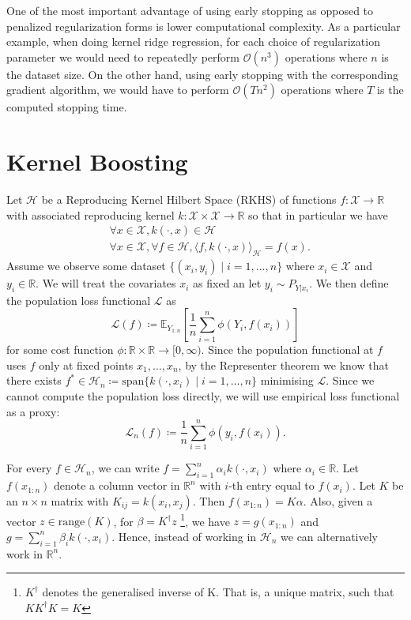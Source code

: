 One of the most important advantage of using early stopping as opposed to penalized
regularization forms is lower computational complexity.
As a particular example, when doing kernel ridge regression, for each choice of
regularization parameter we would need to repeatedly perform $\mathcal{O}(n^{3})$
operations where $n$ is the dataset size. On the other hand, using early stopping
with the corresponding gradient algorithm, we would have to perform $\mathcal{O}(Tn^{2})$
operations where $T$ is the computed stopping time.

\section{Kernel Boosting}

Let $\mathcal{H}$ be a Reproducing Kernel Hilbert Space (RKHS) of functions
$f : \mathcal{X} \to \mathbb{R}$ with associated reproducing kernel
$k : \mathcal{X} \times \mathcal{X} \to \mathbb{R}$ so that in particular we have
\begin{align*}
  &\forall x \in \mathcal{X}, k(\cdot, x) \in \mathcal{H} \\
  &\forall x \in \mathcal{X}, \forall f \in \mathcal{H}, \langle f, k(\cdot, x) \rangle_{\mathcal{H}} = f(x).
\end{align*}
Assume we observe some dataset $\{(x_{i}, y_{i}) \mid i = 1, \dots, n\}$
where $x_{i} \in \mathcal{X}$ and $y_{i} \in \mathbb{R}$.
We will treat the covariates $x_{i}$ as fixed an let $y_{i} \sim P_{Y|x_{i}}$.
We then define the population loss functional $\mathcal{L}$ as
$$
\mathcal{L}(f) \coloneqq \mathbb{E}_{Y_{1:n}}\left[ \frac{1}{n} \sum_{i = 1}^{n} \phi(Y_{i}, f(x_{i})) \right]
$$
for some cost function $\phi : \mathbb{R} \times \mathbb{R} \to [0, \infty)$.
Since the population functional at $f$ uses $f$ only at fixed points $x_{1}, \dots, x_{n}$,
by the Representer theorem we know that there exists
$f^{*} \in \mathcal{H}_{n} \coloneqq \text{span}\{k(\cdot, x_{i}) \mid i = 1, \dots, n\}$
minimising $\mathcal{L}$. Since we cannot compute the population loss directly, we will use
empirical loss functional as a proxy:
$$
\mathcal{L}_{n}(f) \coloneqq \frac{1}{n} \sum_{i=1}^{n} \phi(y_{i}, f(x_{i})).
$$

For every $f \in \mathcal{H}_{n}$, we can write $f = \sum_{i = 1}^{n} \alpha_{i} k(\cdot, x_{i})$
where $\alpha_{i} \in \mathbb{R}$.
Let $f(x_{1:n})$ denote a column vector in $\mathbb{R}^{n}$ with $i$-th entry
equal to $f(x_{i})$. Let $K$ be an $n \times n$ matrix with $K_{ij} = k(x_{i}, x_{j})$.
Then $f(x_{1:n}) = K \alpha$.
Also, given a vector $z \in \text{range}(K)$, for
$\beta = K^{\dagger}z$
\footnote{$K^{\dagger}$ denotes the generalised inverse of K. That is,
a unique matrix, such that $KK^{\dagger}K = K$},
we have $z = g(x_{1:n})$ and $g = \sum_{i=1}^{n} \beta_{i}k(\cdot, x_{i})$.
Hence, instead of working in $\mathcal{H}_{n}$ we can alternatively work in $\mathbb{R}^{n}$.

